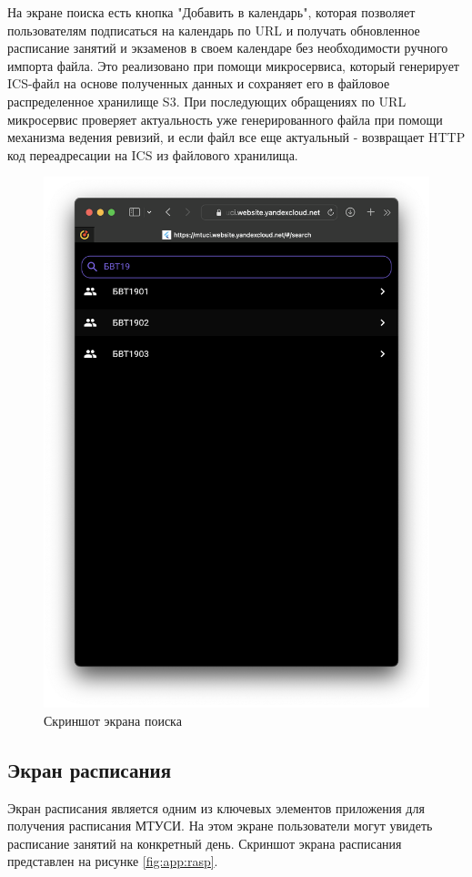 На экране поиска есть кнопка "Добавить в календарь",
которая позволяет пользователям подписаться на календарь по URL
и получать обновленное расписание занятий и экзаменов
в своем календаре без необходимости ручного импорта файла.
Это реализовано при помощи микросервиса, который генерирует ICS-файл
на основе полученных данных и сохраняет его в файловое распределенное хранилище S3.
При последующих обращениях по URL микросервис проверяет актуальность
уже генерированного файла при помощи механизма ведения ревизий,
и если файл все еще актуальный - возвращает HTTP код переадресации на ICS из файлового хранилища.

\begin{figure}
\centering
\includegraphics[width=0.8\linewidth]{images/app/search.png}
\caption{Скриншот экрана поиска}
\label{fig:app:search}
\end{figure}

\break
\subsection{Экран расписания}
Экран расписания является одним из ключевых элементов приложения для получения расписания МТУСИ.
На этом экране пользователи могут увидеть расписание занятий на конкретный день. 
Скриншот экрана расписания представлен на рисунке \ref{fig:app:rasp}.

